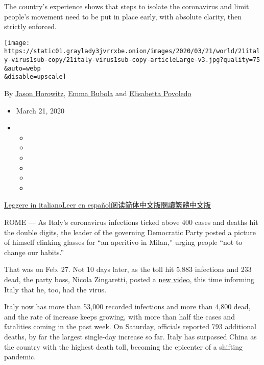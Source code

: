 The country's experience shows that steps to isolate the coronavirus and
limit people's movement need to be put in place early, with absolute
clarity, then strictly enforced.

\texttt{[image: https://static01.graylady3jvrrxbe.onion/images/2020/03/21/world/21italy-virus1sub-copy/21italy-virus1sub-copy-articleLarge-v3.jpg?quality=75\\\&auto=webp\\\&disable=upscale]}

By \href{https://www.nytimes3xbfgragh.onion/by/jason-horowitz}{Jason
Horowitz}, \href{https://www.nytimes3xbfgragh.onion/by/emma-bubola}{Emma
Bubola} and
\href{https://www.nytimes3xbfgragh.onion/by/elisabetta-povoledo}{Elisabetta
Povoledo}

\begin{itemize}
\item
  March 21, 2020
\item
  \begin{itemize}
  \item
  \item
  \item
  \item
  \item
  \item
  \end{itemize}
\end{itemize}

\href{https://www.nytimes3xbfgragh.onion/it/2020/03/22/world/europe/litalia-pandemia.html}{Leggere
in
italiano}\href{https://www.nytimes3xbfgragh.onion/es/2020/03/22/espanol/coronavirus-lecciones-italia.html}{Leer
en
español}\href{https://cn.nytimes3xbfgragh.onion/world/20200323/italy-coronavirus-center-lessons/}{阅读简体中文版}\href{https://cn.nytimes3xbfgragh.onion/world/20200323/italy-coronavirus-center-lessons/zh-hant/}{閱讀繁體中文版}

ROME --- As Italy's coronavirus infections ticked above 400 cases and
deaths hit the double digits, the leader of the governing Democratic
Party posted a picture of himself clinking glasses for ``an aperitivo in
Milan,'' urging people ``not to change our habits.''

That was on Feb. 27. Not 10 days later, as the toll hit 5,883 infections
and 233 dead, the party boss, Nicola Zingaretti, posted a
\href{https://www.nytimes3xbfgragh.onion/2020/03/07/world/europe/coronavirus-italy.html}{new
video,} this time informing Italy that he, too, had the virus.

Italy now has more than 53,000 recorded infections and more than 4,800
dead, and the rate of increase keeps growing, with more than half the
cases and fatalities coming in the past week. On Saturday, officials
reported 793 additional deaths, by far the largest single-day increase
so far. Italy has surpassed China as the country with the highest death
toll, becoming the epicenter of a shifting pandemic.

